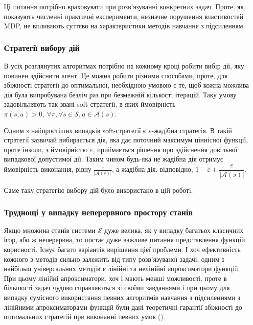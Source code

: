 \documentclass[a4paper,10pt,fleqn]{article}
\begin{document}
Ці питання потрібно враховувати при розв'язуванні конкретних задач. Проте, як показують численні практичні експерименти, незначне порушення властивостей MDP, не впливають суттєво на характеристики методів навчання з підсиленням.

\subsubsection{Стратегії вибору дій}
В усіх розглянутих алгоритмах потрібно на кожному кроці робити вибір дії, яку повинен здійснити агент. Це можна робити різними способами, проте, для збіжності стратегії до оптимальної, необхідною умовою є те, щоб кожна можлива дія була випробувана безліч раз при безмежній кількості ітерацій. Таку умову задовільняють так звані soft-стратегії, в яких ймовірність $\pi(s,a)>0,\ \forall \pi, \forall s \in \mathcal{S}, a \in \mathcal{A}(s)$.

Одним з найпростіших випадків soft-стратегії є $\varepsilon$-жадібна стратегія. В такій стратегії зазвичай вибирається дія, яка дає поточний максимум ціннісної функції, проте інколи, з ймовірністю $\varepsilon$, приймається рішення про здійснення довільної випадкової допустимої дії. Таким чином будь-яка не жадібна дія отримує ймовірність виконання, рівну $\frac{\varepsilon}{|\mathcal{A}(s)|}$, а жадібна дія, відповідно, $ 1 - \varepsilon + \dfrac{\varepsilon}{|\mathcal{A}(s)|}$.

Саме таку стратегію вибору дій було використано в цій роботі.

\subsubsection{Труднощі у випадку неперервного простору станів}

Якщо множина станів системи $\mathcal{S}$ дуже велика, як у випадку багатьох класичних ігор, або ж неперервна, то постає дуже важливе питання представлення функцій корисності. Існує багато варіантів вирішення цієї проблеми. І хоч ефективність кожного з методів сильно залежить від типу розв'язуваної задачі, одним з найбільш універсальних методів є лінійні та нелінійні апроксиматори функцій. При цьому лінійні апроксиматори, хоч і мають менші можливості, проте в більшості задач чудово справляються зі своїми завданнями і при цьому для випадку сумісного використання певних алгоритмів навчання з підсиленнями з лінійними апроксиматорами функцій були дані теоретичні гарантії збіжності до оптимальних стратегій при виконанні певних умов (\cite{Coulom2002}).
\end{document}
